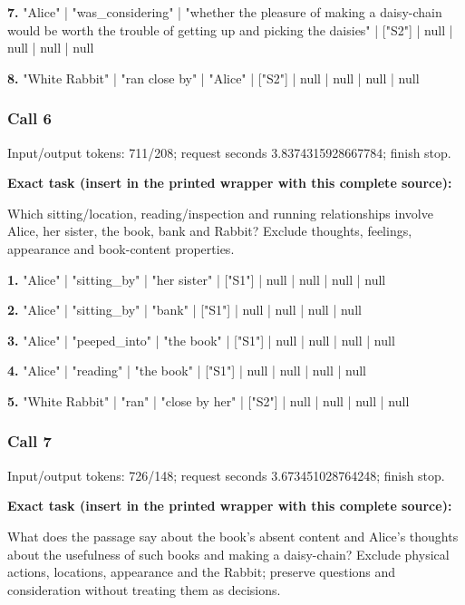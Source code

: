 \noindent\textbf{7.} "Alice" | "was\_considering" | "whether the pleasure of making a daisy-chain would be worth the trouble of getting up and picking the daisies" | ["S2"] | null | null | null | null\par\smallskip

\noindent\textbf{8.} "White Rabbit" | "ran close by" | "Alice" | ["S2"] | null | null | null | null\par\smallskip

\subsubsection*{Call 6}

Input/output tokens: 711/208; request seconds 3.8374315928667784; finish stop.

\noindent\textbf{Exact task (insert in the printed wrapper with this complete source):}\par Which sitting/location, reading/inspection and running relationships involve Alice, her sister, the book, bank and Rabbit? Exclude thoughts, feelings, appearance and book-content properties.

\noindent\textbf{1.} "Alice" | "sitting\_by" | "her sister" | ["S1"] | null | null | null | null\par\smallskip

\noindent\textbf{2.} "Alice" | "sitting\_by" | "bank" | ["S1"] | null | null | null | null\par\smallskip

\noindent\textbf{3.} "Alice" | "peeped\_into" | "the book" | ["S1"] | null | null | null | null\par\smallskip

\noindent\textbf{4.} "Alice" | "reading" | "the book" | ["S1"] | null | null | null | null\par\smallskip

\noindent\textbf{5.} "White Rabbit" | "ran" | "close by her" | ["S2"] | null | null | null | null\par\smallskip

\subsubsection*{Call 7}

Input/output tokens: 726/148; request seconds 3.673451028764248; finish stop.

\noindent\textbf{Exact task (insert in the printed wrapper with this complete source):}\par What does the passage say about the book's absent content and Alice's thoughts about the usefulness of such books and making a daisy-chain? Exclude physical actions, locations, appearance and the Rabbit; preserve questions and consideration without treating them as decisions.

